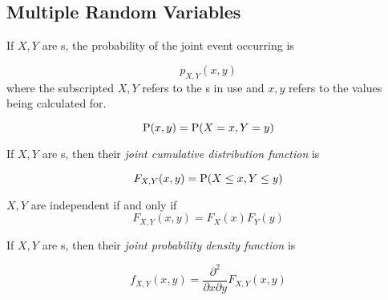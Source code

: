\subsection{Multiple Random Variables}\label{subsec:Multiple_Random_Variables}
\begin{definition}\label{def:Joint_Probability_Distribution}
  If $X, Y$ are s, the probability of the joint event occurring is

  \begin{equation}\label{eq:Joint_Probability_Event}
    p_{X,Y}(x,y)
  \end{equation}
  where the subscripted $X,Y$ refers to the s in use and $x,y$ refers to the values being calculated for.

  \begin{equation}\label{eq:Joint_Probability_Distribution}
    \operatorname{\operatorname{P}}(x, y) = \operatorname{\operatorname{P}}(X=x, Y=y)
  \end{equation}
\end{definition}

\begin{definition}\label{def:Joint_CDF}
  If $X, Y$ are s, then their \emph{joint cumulative distribution function} is

  \begin{equation}\label{eq:Joint_CDF}
    F_{X,Y}(x,y) = \operatorname{\operatorname{P}}(X \leq x, Y \leq y)
  \end{equation}

  \begin{remark}\label{rmk:Independent_Multiple_Random_Variables}
    $X, Y$ are independent if and only if
    \begin{equation}\label{eq:Independent_Multiple_Random_Variables}
      F_{X,Y}(x, y) = F_{X}(x) F_{Y}(y)
    \end{equation}
  \end{remark}
\end{definition}

\begin{definition}\label{def:Joint_PDF}
  If $X, Y$ are s, then their \emph{joint probability density function} is

  \begin{equation}\label{eq:Joint_PDF}
    f_{X,Y}(x,y) = \frac{\partial^{2}}{\partial x \partial y} F_{X,Y}(x,y) 
  \end{equation}
\end{definition}

